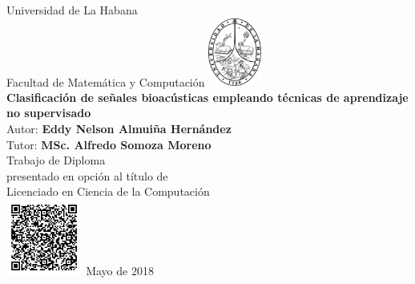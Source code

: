 \documentclass[11pt]{report}
\begin{document}
    \begin{titlepage}
        \begin{center}
        {\large Universidad de La Habana}
            \\ Facultad de Matemática y Computación
            \vskip 0.25cm
            \includegraphics[width=1.75cm]{images/uhlogo} \\
            \vfill
            {\LARGE \textbf{Clasificación de señales bioacústicas empleando técnicas de aprendizaje no supervisado}} \\
            \vskip 2cm
            {\Large Autor: \textbf{Eddy Nelson Almuiña Hernández}} \\
            \vskip 0.5cm
            {\Large Tutor: \textbf{MSc. Alfredo Somoza Moreno}} \\
            \vfill
            {\large Trabajo de Diploma \\presentado en opción al título de \\Licenciado en Ciencia de la Computación} \\
            \vskip 0.5cm
            \includegraphics[width=2.5cm]{images/qrcode}
            \vskip 0.5cm
            Mayo de 2018
        \end{center}
    \end{titlepage}
\end{document}
